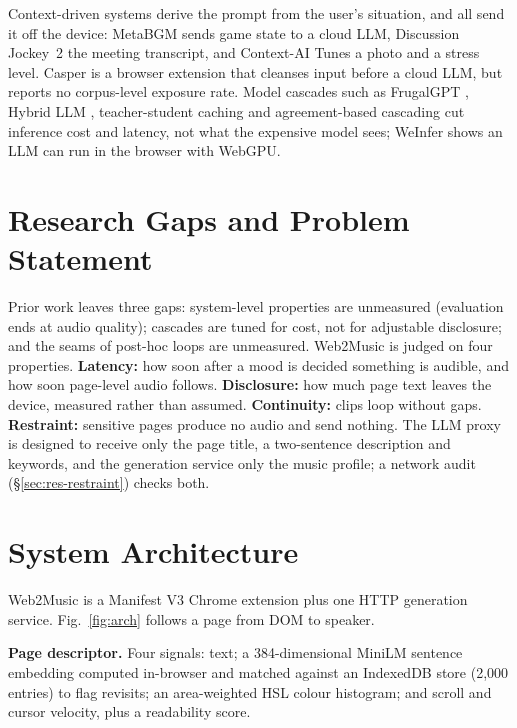 \documentclass[conference]{IEEEtran}
\begin{document}
Context-driven systems derive the prompt from the user's situation, and all send
it off the device: MetaBGM \cite{metabgm} sends game state to a cloud LLM,
Discussion Jockey~2 \cite{suzawa} the meeting transcript, and Context-AI Tunes
\cite{contextai} a photo and a stress level. Casper \cite{casper} is a browser
extension that cleanses input before a cloud LLM, but reports no corpus-level
exposure rate. Model cascades such as FrugalGPT \cite{frugalgpt}, Hybrid LLM
\cite{hybridllm}, teacher-student caching \cite{cachemeifyoucan} and
agreement-based cascading \cite{agreement} cut inference cost and latency, not
what the expensive model sees; WeInfer \cite{weinfer} shows an LLM can run in the
browser with WebGPU.

\section{Research Gaps and Problem Statement}
\label{sec:gaps}

Prior work leaves three gaps: system-level properties are unmeasured (evaluation
ends at audio quality); cascades are tuned for cost, not for adjustable
disclosure; and the seams of post-hoc loops are unmeasured. Web2Music is judged
on four properties. \textbf{Latency:} how soon after a mood is decided something
is audible, and how soon page-level audio follows. \textbf{Disclosure:} how much
page text leaves the device, measured rather than assumed. \textbf{Continuity:}
clips loop without gaps. \textbf{Restraint:} sensitive pages produce no audio and
send nothing. The LLM proxy is designed to receive only the page title, a
two-sentence description and keywords, and the generation service only the music
profile; a network audit (\S\ref{sec:res-restraint}) checks both.

\section{System Architecture}
\label{sec:arch}

Web2Music is a Manifest V3 \cite{mv3} Chrome extension plus one HTTP generation
service. Fig.~\ref{fig:arch} follows a page from DOM to speaker.

\textbf{Page descriptor.} Four signals: text; a 384-dimensional MiniLM sentence
embedding computed in-browser and matched against an IndexedDB store (2,000
entries) to flag revisits; an area-weighted HSL colour histogram; and scroll and
cursor velocity, plus a readability score.
\end{document}
